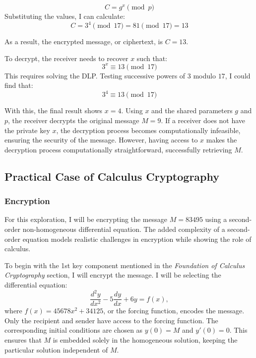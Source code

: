 \documentclass[12pt]{article}
\begin{document}
\[
C = g^x \pmod{p}
\]
\centering Substituting the values, I can calculate:
\[
C = 3^4 \pmod{17} = 81 \pmod{17} = 13
\]

As a result, the encrypted message, or ciphertext, is \( C = 13 \).

\vspace {0.1in}

To decrypt, the receiver needs to recover \( x \) such that:
\[
3^x \equiv 13 \pmod{17}
\]
This requires solving the DLP. Testing successive powers of \( 3 \) modulo \( 17 \), I could find that:
\[
3^4 \equiv 13 \pmod{17}
\]

\raggedright
\setlength{\parindent}{0.5in} %

With this, the final result shows \( x = 4 \). Using \( x \) and the shared parameters \( g \) and \( p \), the receiver decrypts the original message \( M = 9 \). If a receiver does not have the private key \( x \), the decryption process becomes computationally infeasible, ensuring the security of the message. However, having access to \( x \) makes the decryption process computationally straightforward, successfully retrieving \( M \).









\subsection*{Practical Case of Calculus Cryptography}

\subsubsection*{Encryption}

For this exploration, I will be encrypting the message \( M = 83495 \) using a second-order non-homogeneous differential equation. The added complexity of a second-order equation models realistic challenges in encryption while showing the role of calculus.

To begin with the 1st key component mentioned in the \textit{Foundation of Calculus Cryptography} section, I will encrypt the message. I will be selecting the differential equation:
\[
\frac{d^2y}{dx^2} - 5\frac{dy}{dx} + 6y = f(x),
\]
where \( f(x) = 45678x^2 + 34125 \), or the forcing function, encodes the message. Only the recipient and sender have access to the forcing function. The corresponding initial conditions are chosen as \( y(0) = M \) and \( y'(0) = 0 \). This ensures that \( M \) is embedded solely in the homogeneous solution, keeping the particular solution independent of \( M \).
\end{document}
